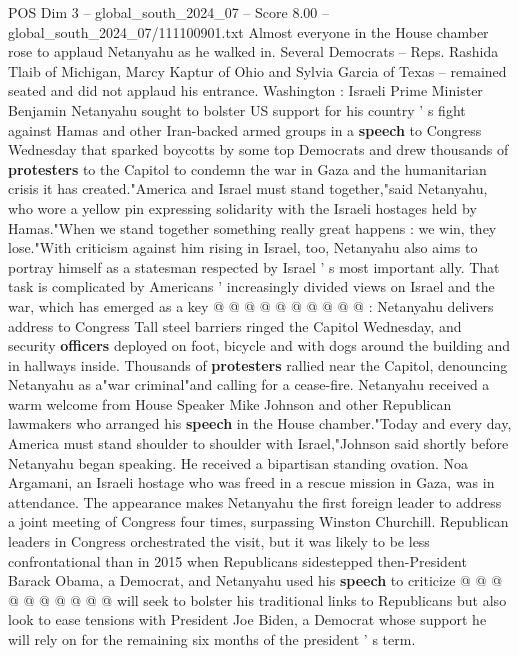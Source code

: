 \begin{textsample}{POS Dim 3 – global\_south\_2024\_07 – Score 8.00 – global\_south\_2024\_07/111100901.txt}  \label{ex:f3_pos_318}
Almost everyone in the House chamber rose to applaud Netanyahu as he walked in.
Several Democrats -- Reps.
Rashida Tlaib of Michigan, Marcy Kaptur of Ohio and Sylvia Garcia of Texas -- remained seated and did not applaud his entrance.
Washington : Israeli Prime Minister Benjamin Netanyahu sought to bolster US support for his country ' s fight against Hamas and other Iran-backed armed groups in a \textbf{speech} to Congress Wednesday that sparked boycotts by some top Democrats and drew thousands of \textbf{protesters} to the Capitol to condemn the war in Gaza and the humanitarian crisis it has created."America and Israel must stand together,"said Netanyahu, who wore a yellow pin expressing solidarity with the Israeli hostages held by Hamas."When we stand together something really great happens : we win, they lose."With criticism against him rising in Israel, too, Netanyahu also aims to portray himself as a statesman respected by Israel ' s most important ally.
That task is complicated by Americans ' increasingly divided views on Israel and the war, which has emerged as a key @ @ @ @ @ @ @ @ @ @ : Netanyahu delivers address to Congress Tall steel barriers ringed the Capitol Wednesday, and security \textbf{officers} deployed on foot, bicycle and with dogs around the building and in hallways inside.
Thousands of \textbf{protesters} rallied near the Capitol, denouncing Netanyahu as a"war criminal"and calling for a cease-fire.
Netanyahu received a warm welcome from House Speaker Mike Johnson and other Republican lawmakers who arranged his \textbf{speech} in the House chamber."Today and every day, America must stand shoulder to shoulder with Israel,"Johnson said shortly before Netanyahu began speaking.
He received a bipartisan standing ovation.
Noa Argamani, an Israeli hostage who was freed in a rescue mission in Gaza, was in attendance.
The appearance makes Netanyahu the first foreign leader to address a joint meeting of Congress four times, surpassing Winston Churchill.
Republican leaders in Congress orchestrated the visit, but it was likely to be less confrontational than in 2015 when Republicans sidestepped then-President Barack Obama, a Democrat, and Netanyahu used his \textbf{speech} to criticize @ @ @ @ @ @ @ @ @ @ will seek to bolster his traditional links to Republicans but also look to ease tensions with President Joe Biden, a Democrat whose support he will rely on for the remaining six months of the president ' s term.

\end{textsample}
